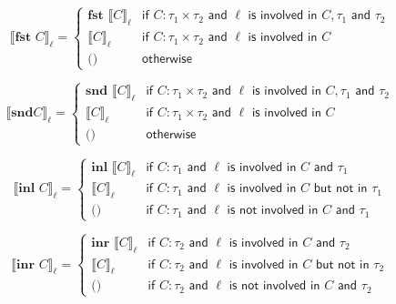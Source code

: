 \documentclass{article}
\begin{document}
$$
 \llbracket  \textbf{fst } C \rrbracket _\ell = \left\{
    \begin{array}{ll}
    \textbf{fst }\llbracket     C \rrbracket _\ell & \textsf{if } C : \tau_1 \times \tau_2 \textsf{ and } \ell \textsf{ is involved in } C,  \tau_1 \textsf{ and } \tau_2\\
    \llbracket C \rrbracket _\ell & \textsf{if } C : \tau_1 \times \tau_2 \textsf{ and } \ell \textsf{ is involved in } C  \\
    \textbf{()} & \textsf{otherwise}
    \end{array}
\right.
$$

$$
 \llbracket  \textbf{snd} C \rrbracket _\ell = \left\{
    \begin{array}{ll}
    \textbf{snd }\llbracket     C \rrbracket _\ell & \textsf{if } C : \tau_1 \times \tau_2 \textsf{ and } \ell \textsf{ is involved in } C,  \tau_1 \textsf{ and } \tau_2\\
    \llbracket C \rrbracket _\ell & \textsf{if } C : \tau_1 \times \tau_2 \textsf{ and } \ell \textsf{ is involved in } C  \\
    \textbf{()} & \textsf{otherwise}
    \end{array}
\right.
$$

$$
 \llbracket  \textbf{inl } C \rrbracket _\ell = \left\{
    \begin{array}{ll}
    \textbf{inl }\llbracket     C \rrbracket _\ell & \textsf{if } C : \tau_1 \textsf{ and } \ell \textsf{ is involved in } C \textsf{ and } \tau_1 \\
    \llbracket     C \rrbracket _\ell & \textsf{if } C : \tau_1 \textsf{ and } \ell \textsf{ is involved in } C \textsf{ but not in } \tau_1 \\
    \textbf{()} & \textsf{if } C : \tau_1 \textsf{ and } \ell \textsf{ is not involved in } C \textsf{ and } \tau_1
    \end{array}
\right.
$$

$$
 \llbracket  \textbf{inr } C \rrbracket _\ell = \left\{
    \begin{array}{ll}
    \textbf{inr }\llbracket     C \rrbracket _\ell & \textsf{if } C : \tau_2 \textsf{ and } \ell \textsf{ is involved in } C \textsf{ and } \tau_2 \\
    \llbracket     C \rrbracket _\ell & \textsf{if } C : \tau_2 \textsf{ and } \ell \textsf{ is involved in } C \textsf{ but not in } \tau_2 \\
    \textbf{()} & \textsf{if } C : \tau_2 \textsf{ and } \ell \textsf{ is not involved in } C \textsf{ and } \tau_2
    \end{array}
\right.
$$
\end{document}
